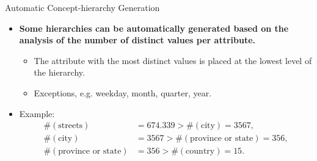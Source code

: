 \begin{frame}{Automatic Concept-hierarchy Generation}
	\begin{itemize}
		\item \textbf{Some hierarchies can be automatically generated based on
			      the analysis of the number of distinct values per attribute.}
		      \begin{itemize}
			      \item The attribute with the most distinct values is placed at the
			            lowest level of the hierarchy.
			      \item Exceptions, e.g. weekday, month, quarter, year.
		      \end{itemize}
		\item Example:
		      \begin{align*}
			      \#(\text{streets})           & = 674.339 > \#(\text{city}) =
			      3567,                                                         \\
			      \#(\text{city})              & =  3567 > \#(\text{province or
			      state}) =  356,                                               \\
			      \#(\text{province or state}) & =  356 > \#(\text{country}) =
			      15.
		      \end{align*}
	\end{itemize}
\end{frame}
